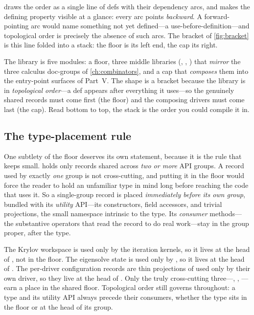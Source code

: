  draws the order as a single line of defs with their dependency arcs,
and makes the defining property visible at a glance: every arc points
\emph{backward}. A forward-pointing arc would name something not yet defined---a
use-before-definition---and topological order is precisely the absence of such arcs.
The bracket of \cref{fig:bracket} is this line folded into a stack: the floor is its
left end, the cap its right.

\begin{keyidea}
The library is five modules: a  floor, three middle libraries
(, , ) that \emph{mirror} the
three calculus doc-groups of \cref{ch:combinators}, and a  cap that
\emph{composes} them into the entry-point surfaces of Part~V. The shape is a
bracket because the library is in \emph{topological order}---a def appears after
everything it uses---so the genuinely shared records must come first (the floor)
and the composing drivers must come last (the cap). Read bottom to top, the stack
is the order you could compile it in.
\end{keyidea}

\subsection{The type-placement rule}
\label{sec:typeplacement}

One subtlety of the floor deserves its own statement, because it is the rule that
keeps  small.  holds only records shared across \emph{two or
more} API groups. A record used by exactly \emph{one} group is not cross-cutting,
and putting it in the floor would force the reader to hold an unfamiliar type in
mind long before reaching the code that uses it. So a single-group record is placed
\emph{immediately before its own group}, bundled with its \emph{utility} API---its
constructors, field accessors, and trivial projections, the small namespace
intrinsic to the type. Its \emph{consumer} methods---the substantive operators that
read the record to do real work---stay in the group proper, after the type.

The Krylov workspace  is used only by the iteration kernels, so it
lives at the head of , not in the floor. The eigensolve state
 is used only by , so it lives at the head of
. The per-driver configuration records are thin projections of
 used only by their own driver, so they live at the head of
. Only the truly cross-cutting three---, ,
---earn a place in the shared floor. Topological order still governs
throughout: a type and its utility API always precede their consumers, whether the
type sits in the floor or at the head of its group.

